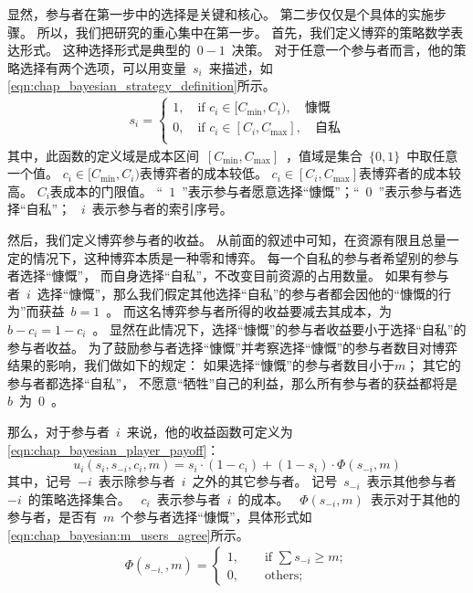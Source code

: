 显然，参与者在第一步中的选择是关键和核心。
第二步仅仅是个具体的实施步骤。
所以，我们把研究的重心集中在第一步。
首先，我们定义博弈的策略数学表达形式。
这种选择形式是典型的~$0-1$~决策。
对于任意一个参与者而言，他的策略选择有两个选项，可以用变量~$s_i$~来描述，如\eqref{eqn:chap_bayesian_strategy_definition}所示。
\begin{align}
    s_i = \begin{cases}
        1, \quad \text{if } c_i \in [C_{\min}, C_i),\quad\text{慷慨}\\
        0, \quad \text{if } c_i \in [C_i, C_{\max}],\quad\text{自私}\\
    \end{cases}
    \label{eqn:chap_bayesian_strategy_definition}
\end{align}
其中，此函数的定义域是成本区间~$[C_{\min}, C_{\max}]$~，值域是集合~$\{0,1\}$~中取任意一个值。
$c_i \in [C_{\min}, C_i)$表博弈者的成本较低。
$c_i \in [C_i, C_{\max}]$表博弈者的成本较高。
$C_i$表成本的门限值。
“~$1$~”表示参与者愿意选择“慷慨”；“~$0$~”表示参与者选择“自私”；
~$i$~表示参与者的索引序号。

然后，我们定义博弈参与者的收益。
从前面的叙述中可知，在资源有限且总量一定的情况下，这种博弈本质是一种零和博弈。
每一个自私的参与者希望别的参与者选择“慷慨”，
而自身选择“自私”，不改变目前资源的占用数量。
如果有参与者~$i$~选择“慷慨”，那么我们假定其他选择“自私”的参与者都会因他的“慷慨的行为”而获益~$b=1$~。
而这名博弈参与者所得的收益要减去其成本，为~$b-c_i= 1-c_i$~。
显然在此情况下，选择“慷慨”的参与者收益要小于选择“自私”的参与者收益。
为了鼓励参与者选择“慷慨”并考察选择“慷慨”的参与者数目对博弈结果的影响，我们做如下的规定：
如果选择“慷慨”的参与者数目小于$m$； 其它的参与者都选择“自私”，
不愿意“牺牲”自己的利益，那么所有参与者的获益都将是~$b$~为~$0$~。

那么，对于参与者~$i$~来说，他的收益函数可定义为\eqref{eqn:chap_bayesian_player_payoff}：
\begin{equation}
 u_i(s_i, s_{-i}, c_i, m) = s_i\cdot (1 - c_i) + (1-s_i) \cdot \Phi(s_{-i},m)
\label{eqn:chap_bayesian_player_payoff}     
\end{equation}
其中，记号~$-i$~表示除参与者~$i$~之外的其它参与者。
记号~$s_{-i}$~表示其他参与者~$-i$~的策略选择集合。
~$c_i$~表示参与者~$i$~的成本。
~$\Phi(s_{-i},m)$~表示对于其他的参与者，是否有~$m$~个参与者选择“慷慨”，具体形式如\eqref{eqn:chap_bayesian:m_users_agree}所示。
\begin{align}
    \Phi(s_{-i,},m) = \begin{cases}
        1, \qquad \text{if } \sum s_{-i} \ge m;\\
        0, \qquad \text{others};
    \end{cases}
    \label{eqn:chap_bayesian:m_users_agree}
\end{align}

